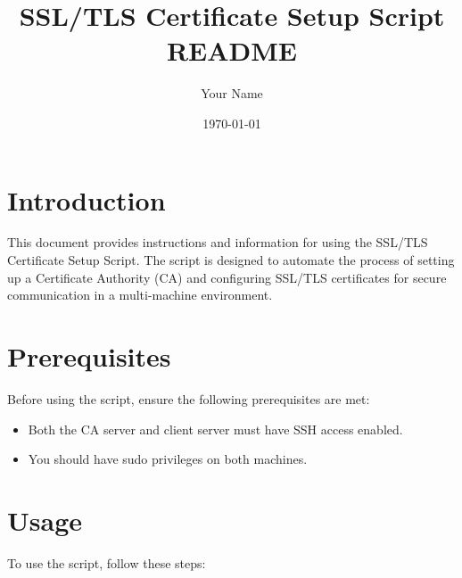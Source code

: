 \documentclass{article}
\begin{document}
\title{SSL/TLS Certificate Setup Script README}
\author{Your Name}
\date{\today}

\maketitle

\section{Introduction}

This document provides instructions and information for using the SSL/TLS Certificate Setup Script. The script is designed to automate the process of setting up a Certificate Authority (CA) and configuring SSL/TLS certificates for secure communication in a multi-machine environment.

\section{Prerequisites}

Before using the script, ensure the following prerequisites are met:

\begin{itemize}
    \item Both the CA server and client server must have SSH access enabled.
    \item You should have sudo privileges on both machines.
\end{itemize}

\section{Usage}

To use the script, follow these steps:
\end{document}
